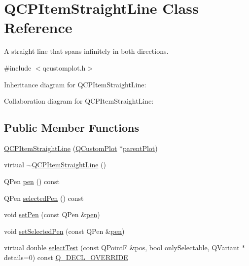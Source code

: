 \hypertarget{class_q_c_p_item_straight_line}{}\section{Q\+C\+P\+Item\+Straight\+Line Class Reference}
\label{class_q_c_p_item_straight_line}


A straight line that spans infinitely in both directions.  




{\ttfamily \#include $<$qcustomplot.\+h$>$}



Inheritance diagram for Q\+C\+P\+Item\+Straight\+Line\+:


Collaboration diagram for Q\+C\+P\+Item\+Straight\+Line\+:
\subsection*{Public Member Functions}
\begin{DoxyCompactItemize}
\item 
\hyperlink{class_q_c_p_item_straight_line_a41fd2e1f006983449eca9830930c3b10}{Q\+C\+P\+Item\+Straight\+Line} (\hyperlink{class_q_custom_plot}{Q\+Custom\+Plot} $\ast$\hyperlink{class_q_c_p_layerable_a473edb813a4c1929d6b6a8fe3ff3faf7}{parent\+Plot})
\item 
virtual \hyperlink{class_q_c_p_item_straight_line_a1f0730759916ce203baeaad1ad2af3ea}{$\sim$\+Q\+C\+P\+Item\+Straight\+Line} ()
\item 
Q\+Pen \hyperlink{class_q_c_p_item_straight_line_aa751d46cf36073607c11508763f85ff6}{pen} () const
\item 
Q\+Pen \hyperlink{class_q_c_p_item_straight_line_ae4a4607045b1d0594f89eee448a31ff9}{selected\+Pen} () const
\item 
void \hyperlink{class_q_c_p_item_straight_line_a9f36c9c9e60d7d9ac084c80380ac8601}{set\+Pen} (const Q\+Pen \&\hyperlink{class_q_c_p_item_straight_line_aa751d46cf36073607c11508763f85ff6}{pen})
\item 
void \hyperlink{class_q_c_p_item_straight_line_a5c33559498d33543fa95cf0a36e851ff}{set\+Selected\+Pen} (const Q\+Pen \&\hyperlink{class_q_c_p_item_straight_line_aa751d46cf36073607c11508763f85ff6}{pen})
\item 
virtual double \hyperlink{class_q_c_p_item_straight_line_a2e36c9d4dcc3aeda78a5584f790e39e3}{select\+Test} (const Q\+PointF \&pos, bool only\+Selectable, Q\+Variant $\ast$details=0) const \hyperlink{qcustomplot_8h_a42cc5eaeb25b85f8b52d2a4b94c56f55}{Q\+\_\+\+D\+E\+C\+L\+\_\+\+O\+V\+E\+R\+R\+I\+DE}
\end{DoxyCompactItemize}
